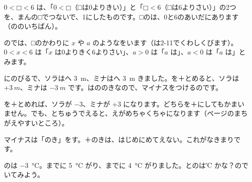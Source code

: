 $0<\text{□}<6$ は、「$0<\text{□}$（□は0よりきい）」と「$\text{□}<6$（□は6よりさい）」の2つを、まんの□でつないで、1にしたものです。□のは、0と6のあいだにあります（ののいちばん）。

のでは、□のかわりに $x$ や $a$ のようなをいます（は2-11でくわしくびます）。$0<x<6$ は「$x$ は0よりきく6よりさい」、$a>0$ は「$a$ は」、$a<0$ は「$a$ は」とみます。


\leavevmode\label{bk:2-2:muki}にのびるで、ソラはへ \qty{3}{m}、ミナはへ \qty{3}{m} きました。を＋とめると、ソラは $+\qty{3}{m}$、ミナは $\qty{-3}{m}$ です。はののきなので、マイナスをつけるのです。

\begin{bkfigure}
\end{bkfigure}

を＋とめれば、ソラが $-3$、ミナが $+3$ になります。どちらを＋にしてもかまいません。でも、とちゅうでえると、えがめちゃくちゃになります（\pageref{bk:2-2:tochu}ページのまちがえやすいところ）。

マイナスは「のき」をす。＋のきは、はじめにめてえない。これがなきまりです。


\leavevmode\label{bk:2-2:keisan}のは \qty{-3}{\degreeCelsius}。までに \qty{5}{\degreeCelsius} がり、までに \qty{4}{\degreeCelsius} がりました。とのは℃ かな？\quad {}のでいてみよう。

